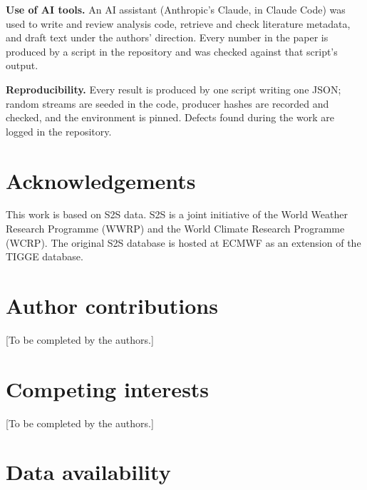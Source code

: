 \documentclass[11pt]{article}
\begin{document}
\textbf{Use of AI tools.} An AI assistant (Anthropic's Claude, in Claude Code) was used to write and review analysis code, retrieve and check literature metadata, and draft text under the authors' direction. Every number in the paper is produced by a script in the repository and was checked against that script's output. 

\textbf{Reproducibility.} Every result is produced by one script writing one JSON; random streams are seeded in the code, producer hashes are recorded and checked, and the environment is pinned. Defects found during the work are logged in the repository.

\nolinenumbers



\section*{Acknowledgements}This work is based on S2S data. S2S is a joint initiative of the World Weather Research Programme (WWRP) and the World Climate Research Programme (WCRP). The original S2S database is hosted at ECMWF as an extension of the TIGGE database.


\section*{Author contributions}

[To be completed by the authors.]


\section*{Competing interests}

[To be completed by the authors.]


\section*{Data availability}
\end{document}
